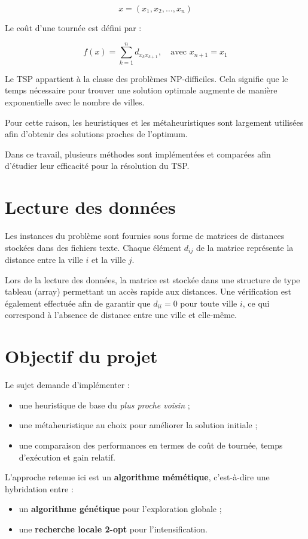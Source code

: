 \documentclass[11pt,a4paper]{article}
\begin{document}
	\[
	x = (x_1,x_2,\dots,x_n)
	\]
	
	Le coût d'une tournée est défini par :
	
	\[
	f(x)=\sum_{k=1}^{n} d_{x_k x_{k+1}}, \quad \text{avec } x_{n+1}=x_1
	\]
	
	Le TSP appartient à la classe des problèmes NP-difficiles.
	Cela signifie que le temps nécessaire pour trouver une solution optimale augmente de manière exponentielle avec le nombre de villes.
	
	Pour cette raison, les heuristiques et les métaheuristiques sont largement utilisées afin d'obtenir des solutions proches de l'optimum.
	
	Dans ce travail, plusieurs méthodes sont implémentées et comparées afin d'étudier leur efficacité pour la résolution du TSP.
	
	\section{Lecture des données}
	
	Les instances du problème sont fournies sous forme de matrices de distances stockées dans des fichiers texte.
	Chaque élément $d_{ij}$ de la matrice représente la distance entre la ville $i$ et la ville $j$.
	
	Lors de la lecture des données, la matrice est stockée dans une structure de type tableau (array) permettant un accès rapide aux distances.
	Une vérification est également effectuée afin de garantir que $d_{ii}=0$ pour toute ville $i$, ce qui correspond à l'absence de distance entre une ville et elle-même.
	
	\section{Objectif du projet}
	Le sujet demande d'implémenter :
	\begin{itemize}
		\item une heuristique de base du \emph{plus proche voisin} ;
		\item une métaheuristique au choix pour améliorer la solution initiale ;
		\item une comparaison des performances en termes de coût de tournée, temps d'exécution et gain relatif.
	\end{itemize}
	
	L'approche retenue ici est un \textbf{algorithme mémétique}, c'est-à-dire une hybridation entre :
	\begin{itemize}
		\item un \textbf{algorithme génétique} pour l'exploration globale ;
		\item une \textbf{recherche locale 2-opt} pour l'intensification.
	\end{itemize}
	
\end{document}
